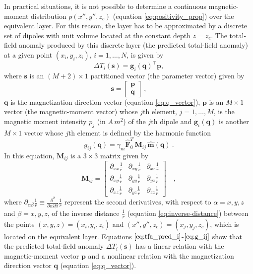 In practical situations, it is not possible to determine a continuous magnetic-moment
distribution $p(x'',y'',z_{c})$ (equation \ref{eq:positivity_prop}) over the 
equivalent layer. 
For this reason, the layer has to be approximated by a discrete set of dipoles with unit 
volume located at the constant depth $z = z_c$.
The total-field anomaly produced by this discrete layer (the predicted total-field anomaly) 
at a given point $(x_{i}, y_{i}, z_{i})$, $i = 1, \dots, N$, is given by
\begin{equation}
\Delta T_{i}(\mathbf{s}) = \mathbf{g}_{i}(\mathbf{q})^{\top} \mathbf{p},
\label{eq:tfa_pred_i}
\end{equation}
where $\mathbf{s}$ is an $(M + 2) \times 1$ partitioned vector (the parameter vector) given by 
\begin{equation}
	\mathbf{s} = \begin{bmatrix}
		\mathbf{p} \\
		\mathbf{q}
	\end{bmatrix} \: ,
	\label{eq:parameter-vector}
\end{equation}
$\mathbf{q}$ is the magnetization direction vector (equation \ref{eq:q_vector}), $\mathbf{p}$ is an 
$M \times 1$ vector (the magnetic-moment vector) whose $j$th element, $j = 1, \dots, M$, is the 
magnetic moment intensity $p_{j}$ (in $A \, m^{2}$) of the $j$th dipole and 
$\mathbf{g}_{i} (\mathbf{q})$ is another $M \times 1$ vector whose $j$th element is defined 
by the harmonic function
\begin{equation}
g_{ij} (\mathbf{q})  = \gamma_m \hat{\mathbf{F}}_{0}^T \, 
\mathbf{M}_{ij} \, \hat{\mathbf{m}}(\mathbf{q}) \: .
\label{eq:g_ij}
\end{equation}
In this equation, $\mathbf{M}_{ij}$ is a $3 \times 3$ matrix given by
\begin{equation}
\mathbf{M}_{ij} = \begin{bmatrix}
\partial_{xx} \frac{1}{r} & 
\partial_{xy} \frac{1}{r} &
\partial_{xz} \frac{1}{r} \\
\partial_{xy} \frac{1}{r} & 
\partial_{yy} \frac{1}{r} &
\partial_{yz} \frac{1}{r} \\
\partial_{xz} \frac{1}{r} & 
\partial_{yz} \frac{1}{r} &
\partial_{zz} \frac{1}{r}
\end{bmatrix} \quad ,
\label{eq:Mij-matrix}
\end{equation}
where $\partial_{\alpha\beta} \frac{1}{r} \equiv 
\frac{\partial^{2}}{\partial \alpha \partial \beta} \frac{1}{r}$ 
represent the second derivatives,
with respect to $\alpha = x, y, z$ and $\beta = x, y, z$, of the inverse distance 
$\frac{1}{r}$ (equation \ref{eq:inverse-distance}) between the points 
$(x, y, z) = (x_{i}, y_{i}, z_{i})$ and 
$(x'', y'', z_{c}) = (x_{j}, y_{j}, z_{c})$, which is located on the equivalent layer.
Equations $\ref{eq:tfa_pred_i}$-$\ref{eq:g_ij}$ show that the predicted total-field anomaly 
$\Delta T_{i}(\mathbf{s})$ has a linear relation with the magnetic-moment vector $\mathbf{p}$ 
and a nonlinear relation with the magnetization direction vector $\mathbf{q}$ 
(equation \ref{eq:q_vector}).


